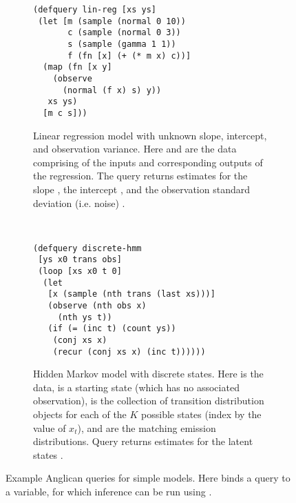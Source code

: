 \begin{figure}[t]
	\centering
	\begin{subfigure}[t]{0.45\textwidth}
			\centering	
\begin{lstlisting}[basicstyle=\ttfamily\footnotesize]
(defquery lin-reg [xs ys]
 (let [m (sample (normal 0 10))  
       c (sample (normal 0 3))
       s (sample (gamma 1 1))
       f (fn [x] (+ (* m x) c))]
  (map (fn [x y]
    (observe 
      (normal (f x) s) y))
   xs ys)
  [m c s]))
\end{lstlisting}				
			\caption{Linear regression model with unknown slope, intercept, and
				observation variance.  Here  and
	  are the data comprising of the inputs and corresponding
	 outputs of the regression.  The query returns estimates
	 for the slope , the intercept , and the observation
	 standard deviation (i.e. noise) . \label{fig:probprog:lregang}
		}
	\end{subfigure}
~~
	\begin{subfigure}[t]{0.52\textwidth}
		\centering	
\begin{lstlisting}[basicstyle=\ttfamily\footnotesize]
(defquery discrete-hmm
 [ys x0 trans obs]
 (loop [xs x0 t 0]
  (let 
   [x (sample (nth trans (last xs)))]
   (observe (nth obs x) 
     (nth ys t))
   (if (= (inc t) (count ys))
    (conj xs x)
    (recur (conj xs x) (inc t))))))
\end{lstlisting}	
		\caption{Hidden Markov model with discrete states.
	Here  is the data,  is a starting state (which
	has no associated observation),  is the collection of 
	transition distribution objects for each of the $K$ possible states
	(index by the value of $x_t$), and  are the matching
	emission distributions.	Query returns
	estimates for the latent states .\label{fig:probprog:hmm}
		 }
	\end{subfigure}
	\vspace{5pt}
		\caption{Example Anglican queries for simple models. Here 
			binds a query to a variable, for which inference can be run using
			{\footnotesize {}}. 
			\label{fig:probprog:example-ang}}
\end{figure}

